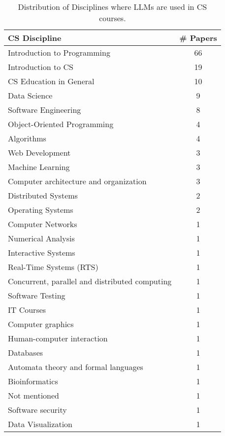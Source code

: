 \begin{table}[ht]
    \centering
    \caption{Distribution of Disciplines where LLMs are used in CS courses.}
    \begin{tabular}{l c}
        \toprule
        \textbf{CS Discipline} & \textbf{\# Papers} \\
        \midrule
		Introduction to Programming & 66 \\
		Introduction to CS & 19 \\
		CS Education in General & 10 \\
		Data Science & 9 \\
		Software Engineering & 8 \\
		Object-Oriented Programming & 4 \\
		Algorithms & 4 \\
		Web Development & 3 \\
		Machine Learning & 3 \\
		Computer architecture and organization & 3 \\
		Distributed Systems & 2 \\
		Operating Systems & 2 \\
		Computer Networks & 1 \\
		Numerical Analysis & 1 \\
		Interactive Systems & 1 \\
		Real-Time Systems (RTS) & 1 \\
		Concurrent, parallel and distributed computing & 1 \\
		Software Testing & 1 \\
		IT Courses & 1 \\
		Computer graphics & 1 \\
		Human-computer interaction & 1 \\
		Databases & 1 \\
		Automata theory and formal languages & 1 \\
		Bioinformatics & 1 \\
		Not mentioned & 1 \\
		Software security & 1 \\
		Data Visualization & 1 \\
	\bottomrule
    \end{tabular}
    \label{tab:discipline}
\end{table}